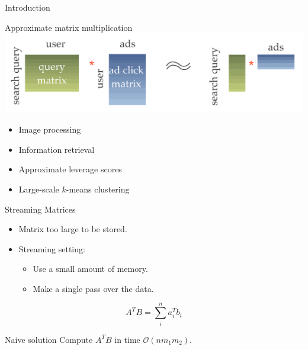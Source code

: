 \documentclass{beamer}
\def\MO{{\mathcal O}}
\begin{document}
\begin{frame}{Introduction}
	  \begin{block}{Approximate matrix multiplication}
	 	\includegraphics*[scale=0.278]{figures/test.pdf}  
	 \end{block}
	
	
	
	\begin{itemize}
		\item {
			Image processing
		}
		\item {
			Information retrieval
		}
		\item{
			Approximate leverage scores
		}
		\item { 
			Large-scale $k$-means clustering
		}
	\end{itemize}
	
\end{frame}

\begin{frame} {Streaming Matrices}
	
	\begin{itemize}
		\item Matrix too large to be stored.
	
		\item Streaming setting:
		\begin{itemize}
			\item Use a small amount of memory.
			\item Make a single pass over the data. 
		\end{itemize}
	\end{itemize}
	\pause 
	$$A^TB=\sum_i^n a_i^Tb_i$$
	\begin{block}{Naive solution}
		Compute $A^TB$ in time $\MO(nm_1m_2)$.%
	\end{block}
\end{frame} 
\end{document}
